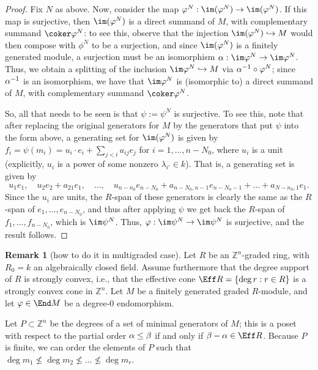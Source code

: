 \documentclass[12pt]{article}
\let\b\beta
\let\l\lambda
\def\ZZ{\mathbb Z}
\let\inc\hookrightarrow
\theoremstyle{theorem}
\numberwithin{thm}{section}
\theoremstyle{definition}
\newtheorem{rem}[thm]{Remark}
\begin{document}
\begin{proof}
Fix $N$ as above.
Now, consider the map $ \phi^N: \im(\phi^N) \to \im(\phi^N)$. If this map is surjective, then $\im(\phi^N)$ is a direct summand of $M$, with complementary summand $\coker \phi^N$: to see this, observe that the injection $\im(\phi^N) \inc M$ would then  compose with $\phi^N$ to be a surjection, and since $\im(\phi^N)$ is a finitely generated module, a surjection must be an isomorphism $\a:\im \phi^N \to \im \phi^N$. Thus, we obtain a splitting of the inclusion $\im \phi^N \inc M$ via $\alpha^{-1}\circ \varphi^N$; since $\alpha^{-1}$ is an isomorphism, we have that $\im \phi^N$ is (isomorphic to) a direct summand of $M$, with complementary summand $\coker \phi^N$.

So, all that needs to be seen is that $\psi:=\psi^N$ is surjective.
To see this, note that after replacing the original generators for $M$ by the generators that put $\psi$ into the form above,  a generating set for $\im(\phi^N)$ is given by $f_i = \psi(m_i) = u_i\cdot e_i + \sum_{j<i } a_{ij} e_j$ for $i = 1,\dots,n-N_0$, where $u_i$ is a unit (explicitly, $u_i$ is a power of some nonzero $\l_{i'}\in k$).
That is, a generating set is given by
$$u_1 e_1,\quad  u_2 e_2+a_{21}e_1,\quad \dots ,\quad u_{n-n_0}e_{n-N_0}+a_{n-N_0,n-1}e_{n-N_0-1}+\dots + a_{N-n_0,1}e_1.$$
Since the $u_i$ are units, the $R$-span of these generators is clearly the same as the $R$-span of $e_1,\dots,e_{n-N_0}$, and thus after applying $\psi$ we get back the $R$-span of $f_1,\dots,f_{n-N_0} $, which is $\im \psi^N$. Thus, $\phi: \im \psi^N \to \im \psi^N$ is surjective, and the result follows.
\end{proof}

\begin{rem}[how to do it in multigraded case]
Let $R$ be an $\ZZ^n$-graded ring, with $R_0=k$ an algebraically closed field.
Assume furthermore that the degree support of $R$ is strongly convex, i.e., that
the effective cone
$\Eff R = \{ \deg r : r\in R\}$ is a strongly convex cone in $\ZZ^n$.
Let $M$ be a finitely generated graded $R$-module, and let $\phi \in \End M$ be a degree-0 endomorphism.

Let $P\subset \ZZ^n$ be the degrees of a set of minimal generators of $M$;
this is a poset with respect to the partial order $\a\leq \b$ if and only if $\b-\a\in \Eff R$.
Because $P$ is finite, we can order the elements of $P$ such that
$\deg m_1\not\leq \deg m_2\not \leq \dots\not\leq \deg m_r$.


\end{rem}
\end{document}

